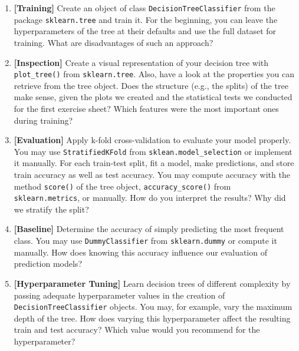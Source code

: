 \documentclass[12pt]{article}
\newcommand{\code}[1]{\textcolor{kitgreen}{\texttt{#1}}}
\newcommand{\taskname}[1]{\textcolor{kitblue}{\textbf{[#1]}}}
\begin{document}
\begin{enumerate}[label=\alph*), left=0pt, itemsep=12pt]
	\item
	\taskname{Training}
	Create an object of class \code{DecisionTreeClassifier} from the package \code{sklearn.tree} and train it.
	For the beginning, you can leave the hyperparameters of the tree at their defaults and use the full dataset for training.
	\newline
	What are disadvantages of such an approach?
	\item
	\taskname{Inspection}
	Create a visual representation of your decision tree with \code{plot\_tree()} from \code{sklearn.tree}.
	Also, have a look at the properties you can retrieve from the tree object.
	\newline
	Does the structure (e.g., the splits) of the tree make sense, given the plots we created and the statistical tests we conducted for the first exercise sheet?
	Which features were the most important ones during training?
	\item
	\taskname{Evaluation}
	Apply k-fold cross-validation to evaluate your model properly.
	You may use \code{StratifiedKFold} from \code{sklean.model\_selection} or implement it manually.
	For each train-test split, fit a model, make predictions, and store train accuracy as well as test accuracy.
	You may compute accuracy with the method \code{score()} of the tree object, \code{accuracy\_score()} from \code{sklearn.metrics}, or manually.
	\newline
	How do you interpret the results?
	Why did we stratify the split?
	\item
	\taskname{Baseline}
	Determine the accuracy of simply predicting the most frequent class.
	You may use \code{DummyClassifier} from \code{sklearn.dummy} or compute it manually.
	\newline
	How does knowing this accuracy influence our evaluation of prediction models?
	\item
	\taskname{Hyperparameter Tuning}
	Learn decision trees of different complexity by passing adequate hyperparameter values in the creation of \code{DecisionTreeClassifier} objects.
	You may, for example, vary the maximum depth of the tree.
	\newline
	How does varying this hyperparameter affect the resulting train and test accuracy?
	Which value would you recommend for the hyperparameter?
\end{enumerate}
\end{document}
